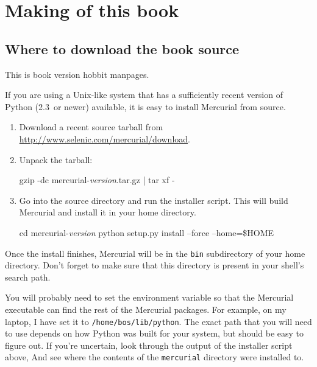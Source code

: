 \chapter{Making of this book}
\label{chap:bookmaking}

\section{Where to download the book source}
\label{sec:srcinstall:unixlike}

This is book version hobbit manpages.



If you are using a Unix-like system that has a sufficiently recent
version of Python (2.3~or newer) available, it is easy to install
Mercurial from source.

\begin{enumerate}
\item Download a recent source tarball from
  \url{http://www.selenic.com/mercurial/download}.
\item Unpack the tarball:
  \begin{codesample4}
    gzip -dc mercurial-\emph{version}.tar.gz | tar xf -
  \end{codesample4}
\item Go into the source directory and run the installer script.  This
  will build Mercurial and install it in your home directory.
  \begin{codesample4}
    cd mercurial-\emph{version}
    python setup.py install --force --home=\$HOME
  \end{codesample4}
\end{enumerate}
Once the install finishes, Mercurial will be in the \texttt{bin}
subdirectory of your home directory.  Don't forget to make sure that
this directory is present in your shell's search path.

You will probably need to set the  environment
variable so that the Mercurial executable can find the rest of the
Mercurial packages.  For example, on my laptop, I have set it to
\texttt{/home/bos/lib/python}.  The exact path that you will need to
use depends on how Python was built for your system, but should be
easy to figure out.  If you're uncertain, look through the output of
the installer script above, And see where the contents of the
\texttt{mercurial} directory were installed to.

